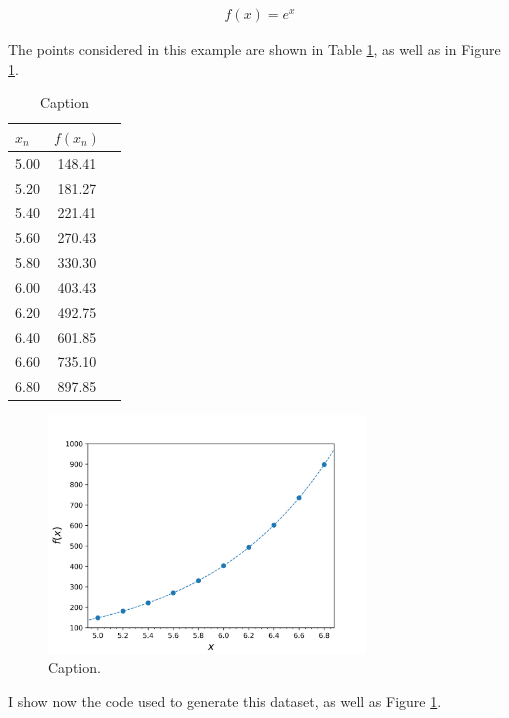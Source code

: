 \documentclass{article}%
\begin{document}
\begin{align}
    f(x) = e^{x}
	\label{eqn:exp}
\end{align}

The points considered in this example are shown in Table \ref{tab:dataset}, as well as in Figure \ref{fig:Fig1}.

\begin{table}[h!]
	\begin{center}
		\caption{Caption}
		\label{tab:dataset}
		\begin{tabular}{l|c|r} %
			$x_n$ & $f(x_n)$\\
			\hline
				5.00 & 148.41\\
				5.20 & 181.27\\
				5.40 & 221.41\\
				5.60 & 270.43\\
				5.80 & 330.30\\
				6.00 & 403.43\\
				6.20 & 492.75\\
				6.40 & 601.85\\
				6.60 & 735.10\\
				6.80 & 897.85\\
		\end{tabular}
	\end{center}
\end{table}

\begin{figure}[!htbp]
	\centering
	\includegraphics[width=0.75\textwidth]{figures/Fig1.png}
	\caption{Caption.}
	\label{fig:Fig1}
\end{figure}

I show now the code used to generate this dataset, as well as Figure \ref{fig:Fig1}.
\end{document}
